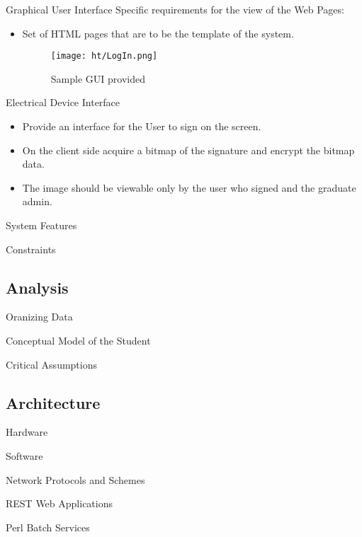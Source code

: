 \documentclass{beamer}
\begin{document}
\begin{frame}{Graphical User Interface}
Specific requirements for the view of the Web Pages:
\begin{itemize}
\item 
Set of HTML pages that are to be the template of the system.
\begin{figure}
\texttt{[image: ht/LogIn.png]} \caption{ Sample GUI provided }
\end{figure}
\end{itemize}
\end{frame}


\begin{frame}{Electrical Device Interface}
\begin{itemize}
\item
Provide an interface for the User to sign on the screen.
\item
On the client side acquire a bitmap of the signature and encrypt the bitmap data.
\item 
The image should be viewable only by the user who signed and the graduate admin.
\end{itemize}
\end{frame}

\begin{frame}{System Features}
\end{frame}

\begin{frame}{Constraints}
\end{frame}

\subsection{Analysis}
\begin{frame}{Oranizing Data}
\end{frame}
\begin{frame}{Conceptual Model of the Student}
\end{frame}
\begin{frame}{Critical Assumptions}
\end{frame}

\subsection{Architecture}
\begin{frame}{Hardware}
\end{frame}
\begin{frame}{Software}
\end{frame}
\begin{frame}{Network Protocols and Schemes}
\end{frame}
\begin{frame}{ REST Web Applications}
\end{frame}
\begin{frame}{Perl Batch Services}
\end{frame}
\end{document}
